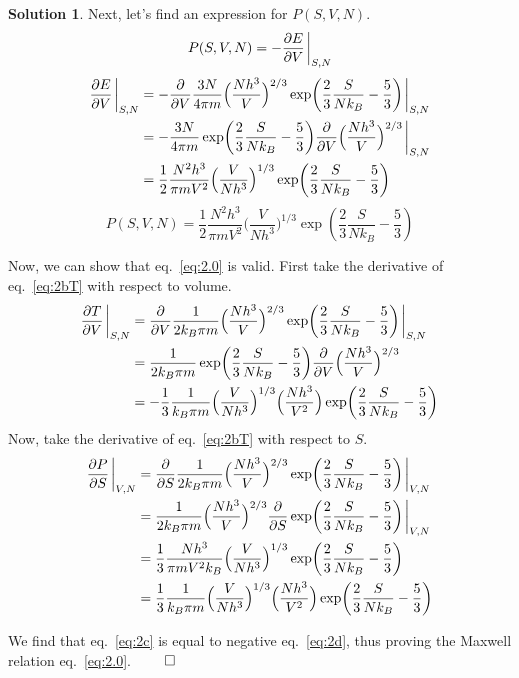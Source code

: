 \documentclass[11pt]{article}
\theoremstyle{definition}
\newtheorem*{solution}{Solution}
\numberwithin{equation}{section}
\numberwithin{figure}{section}
\begin{document}
\begin{solution}
Next, let's find an expression for $P(S,V,N)$.
\begin{equation}
P(S,V,N) = -\pdv{E}{V}\eval_{S,N}
\end{equation}
\begin{align}
	\begin{aligned}
\pdv{E}{V}\eval_{S,N} &= - \pdv{V} \frac{3N}{4\pi m} \Big( \frac{Nh^3}{V} \Big) ^{2/3} \exp(\frac{2}{3}\frac{S}{Nk_B} - \frac{5}{3}) \eval_{S,N}
\\
&= - \frac{3N}{4\pi m} \exp(\frac{2}{3}\frac{S}{Nk_B} - \frac{5}{3}) \pdv{V} \Big( \frac{Nh^3}{V} \Big) ^{2/3} \eval_{S,N}
\\
&= \frac{1}{2}\frac{N^2h^3}{\pi m V^2} \Big( \frac{V}{Nh^3} \Big)^{1/3} \exp(\frac{2}{3}\frac{S}{Nk_B} - \frac{5}{3})
\end{aligned}
\end{align}
\begin{equation}
\boxed{P(S,V,N) = \frac{1}{2}\frac{N^2h^3}{\pi m V^2} \Big( \frac{V}{Nh^3} \Big)^{1/3} \exp(\frac{2}{3}\frac{S}{Nk_B} - \frac{5}{3})}\label{eq:2bP}
\end{equation}

Now, we can show that eq.~\eqref{eq:2.0} is valid. First take the derivative of eq.~\eqref{eq:2bT} with respect to volume.
\begin{equation}
\begin{aligned}
\pdv{T}{V}\eval_{S,N} &= \pdv{V} \frac{1}{2k_B\pi m} \Big( \frac{Nh^3}{V} \Big) ^{2/3} \exp(\frac{2}{3}\frac{S}{Nk_B} - \frac{5}{3}) \eval_{S,N}
\\
&= \frac{1}{2k_B\pi m} \exp(\frac{2}{3}\frac{S}{Nk_B} - \frac{5}{3}) \pdv{V} \Big( \frac{Nh^3}{V} \Big) ^{2/3}
\\
&= - \frac{1}{3} \frac{1}{k_B\pi m} \Big(\frac{V}{Nh^3} \Big)^{1/3} \Big( \frac{Nh^3}{V^2} \Big) \exp(\frac{2}{3}\frac{S}{Nk_B} - \frac{5}{3}) \label{eq:2c}
\end{aligned}
\end{equation}
Now, take the derivative of eq.~\eqref{eq:2bT} with respect to $S$.
\begin{equation}
\begin{aligned}
\pdv{P}{S}\eval_{V,N} &= \pdv{S} \frac{1}{2k_B\pi m} \Big( \frac{Nh^3}{V} \Big) ^{2/3} \exp(\frac{2}{3}\frac{S}{Nk_B} - \frac{5}{3}) \eval_{V,N}
\\
&= \frac{1}{2k_B\pi m} \Big( \frac{Nh^3}{V} \Big) ^{2/3}  \pdv{S} \exp(\frac{2}{3}\frac{S}{Nk_B} - \frac{5}{3}) \eval_{V,N}
\\
&= \frac{1}{3} \frac{Nh^3}{\pi m V^2k_B} \Big( \frac{V}{Nh^3} \Big)^{1/3}  \exp(\frac{2}{3}\frac{S}{Nk_B} - \frac{5}{3})
\\
&= \frac{1}{3} \frac{1}{k_B\pi m} \Big(\frac{V}{Nh^3} \Big)^{1/3} \Big( \frac{Nh^3}{V^2} \Big) \exp(\frac{2}{3}\frac{S}{Nk_B} - \frac{5}{3}) \label{eq:2d}
\end{aligned}
\end{equation}

We find that eq.~\eqref{eq:2c} is equal to negative eq.~\eqref{eq:2d}, thus proving the Maxwell relation eq.~\eqref{eq:2.0}. $\qedhere$
\end{solution}
\end{document}
